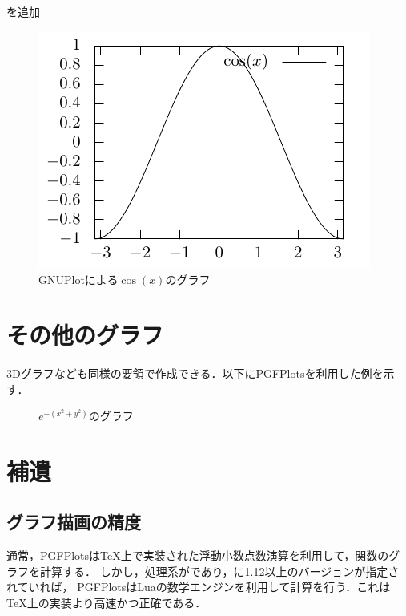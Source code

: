 \documentclass[../../index]{subfiles}
\begin{document}
\inlinecode{\usepackage{gnuplot-lua-tikz}}を追加

\begin{codeblock}

\end{codeblock}

\begin{figure}[htbp]
  \centering
  \includegraphics{gnuplot.pdf}
  \caption{GNUPlotによる\(\cos(x)\)のグラフ}
\end{figure}

\section{その他のグラフ}
3Dグラフなども同様の要領で作成できる．以下にPGFPlotsを利用した例を示す．

\begin{codeblock}
\end{codeblock}

\begin{figure}[htbp]
  \centering
  \caption{$e^{-(x^2+y^2)}$のグラフ}
\end{figure}

\section{補遺}
\subsection{グラフ描画の精度}
通常，PGFPlotsは\TeX 上で実装された浮動小数点数演算を利用して，関数のグラフを計算する．
しかし，処理系が\LuaLaTeX であり，に1.12以上のバージョンが指定されていれば，
PGFPlotsはLuaの数学エンジンを利用して計算を行う．これは\TeX 上の実装より高速かつ正確である\cite[p.54]{christian2021}．
\end{document}
